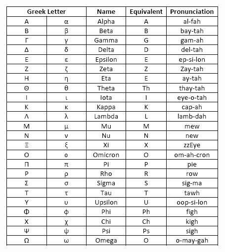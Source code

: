 \documentclass[oneside]{article}
\begin{document}
\includegraphics{apha.png}









\end{document}

